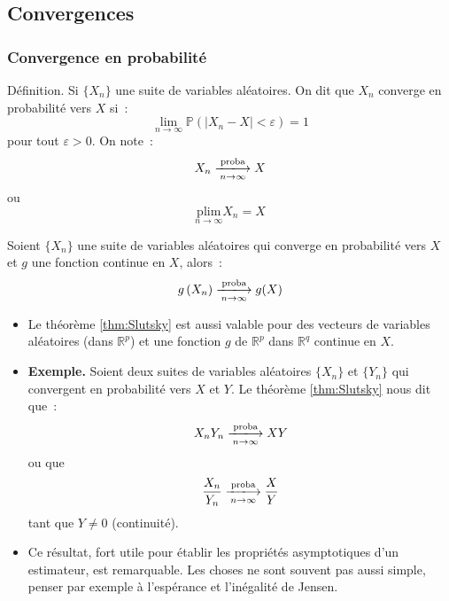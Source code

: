 \documentclass[10pt]{beamer}
\theoremstyle{plain}
\newenvironment{defn}[1]
{\bgroup \small\begin{block}{Définition. #1}}
  {\end{block}\egroup}
\begin{document}
\subsection{Convergences}

\begin{frame}
  \frametitle{Convergence en probabilité}

  \begin{defn}{}
    Si $\{X_n\}$ une suite de variables aléatoires. On dit que $X_n$ converge en probabilité vers $X$ si~:
    \[
      \underset{n\rightarrow\infty}{\lim} \mathbb P\left( |X_n-X|<\varepsilon \right) = 1
    \]
    pour tout $\varepsilon>0$. On note~:
    \[
      X_n \xlongrightarrow[n\rightarrow\infty]{\text{proba}} X
    \]
    ou
    \[
      \underset{n\rightarrow\infty}{\text{plim}} X_n = X
    \]
  \end{defn}

  \bigskip

  \begin{theorem}\label{thm:Slutsky} Soient $\{X_n\}$ une suite de variables
    aléatoires qui converge en probabilité vers $X$ et $g$ une
    fonction continue en $X$, alors~:
    \[
      g\left( X_n \right)\xlongrightarrow[n\rightarrow\infty]{\text{proba}} g(X)
    \]
  \end{theorem}

\end{frame}


\begin{notes}

  \begin{itemize}

  \item Le théorème \ref{thm:Slutsky} est aussi valable pour des vecteurs de variables aléatoires (dans $\mathbb R^p$) et une fonction $g$ de $\mathbb R^p$ dans $\mathbb R^q$ continue en $X$.\newline

  \item \textbf{Exemple.} Soient deux suites de variables aléatoires $\{X_n\}$ et $\{Y_n\}$ qui convergent en probabilité vers $X$ et $Y$. Le théorème \ref{thm:Slutsky} nous dit que~:
    \[
      X_nY_n \xlongrightarrow[n\rightarrow\infty]{\text{proba}} XY
    \]
    ou que
    \[
      \frac{X_n}{Y_n} \xlongrightarrow[n\rightarrow\infty]{\text{proba}} \frac{X}{Y}
    \]
    tant que $Y\neq 0$ (continuité).\newline

  \item Ce résultat, fort utile pour établir les propriétés asymptotiques d'un estimateur, est remarquable. Les choses ne sont souvent pas aussi simple, penser par exemple à l'espérance et l'inégalité de Jensen.

  \end{itemize}

\end{notes}
\end{document}
